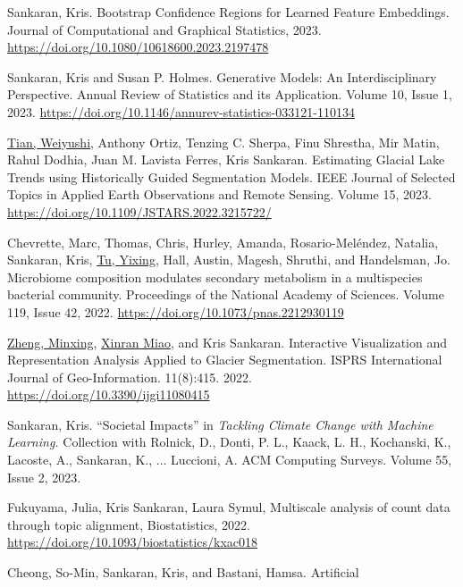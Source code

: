 \documentclass[letterpaper]{article}
\renewenvironment{itemize}{
  \begin{list}{}{
    \setlength{\leftmargin}{1.5em}
  }
}{
  \end{list}
}
\begin{document}
\begin{itemize}
\item Sankaran, Kris. Bootstrap Confidence Regions for Learned Feature
Embeddings. Journal of Computational and Graphical Statistics, 2023. 
\href{https://doi.org/10.1080/10618600.2023.2197478}{https://doi.org/10.1080/10618600.2023.2197478}
\item Sankaran, Kris and Susan P. Holmes. Generative Models: An
Interdisciplinary Perspective. Annual Review of Statistics and its
Application. Volume 10, Issue 1, 2023. \href{https://doi.org/10.1146/annurev-statistics-033121-110134}{https://doi.org/10.1146/annurev-statistics-033121-110134}
\item \underline{Tian, Weiyushi}, Anthony Ortiz, Tenzing C. Sherpa, Finu Shrestha, Mir
Matin, Rahul Dodhia, Juan M. Lavista Ferres, Kris Sankaran. Estimating
Glacial Lake Trends using Historically Guided Segmentation Models. IEEE Journal
of Selected Topics in Applied Earth Observations and Remote Sensing. Volume 15,
2023. \href{https://doi.org/10.1109/JSTARS.2022.3215722/}{https://doi.org/10.1109/JSTARS.2022.3215722/}
\item Chevrette, Marc, Thomas, Chris, Hurley, Amanda, Rosario-Mel{\'e}ndez,
Natalia, Sankaran, Kris, \underline{Tu, Yixing}, Hall, Austin, Magesh, Shruthi,
and Handelsman, Jo. Microbiome composition modulates secondary metabolism in a
multispecies bacterial community. Proceedings of the National Academy of
Sciences. Volume 119, Issue 42, 2022. \href{https://doi.org/10.1073/pnas.2212930119}{https://doi.org/10.1073/pnas.2212930119}
\item \underline{Zheng, Minxing}, \underline{Xinran Miao}, and Kris Sankaran.
Interactive Visualization and Representation Analysis Applied to Glacier
Segmentation. ISPRS International Journal of Geo-Information. 11(8):415. 2022.
\href{https://doi.org/10.3390/ijgi11080415}{https://doi.org/10.3390/ijgi11080415}
\item Sankaran, Kris. ``Societal Impacts'' in \textit{Tackling Climate Change
with Machine Learning.} Collection with Rolnick, D., Donti, P. L., Kaack, L.
H., Kochanski, K., Lacoste, A., Sankaran, K., ... Luccioni, A. ACM Computing
Surveys. Volume 55, Issue 2, 2023.
\item Fukuyama, Julia, Kris Sankaran, Laura Symul, Multiscale analysis of count
data through topic alignment, Biostatistics, 2022.
\href{https://doi.org/10.1093/biostatistics/kxac018}{https://doi.org/10.1093/biostatistics/kxac018}
\item Cheong, So-Min, Sankaran, Kris, and Bastani, Hamsa. Artificial

\end{itemize}
\end{document}
